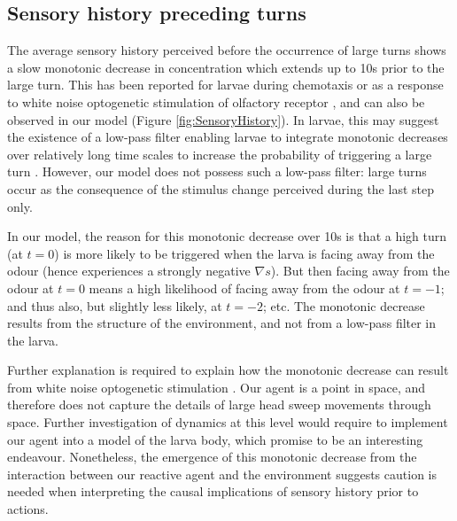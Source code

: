 \documentclass[11pt,a4paper]{article}
\newcommand{\todoML}[1]{\todo[author=ML,color=white, size=\tiny,inline]{#1}}
\begin{document}
\subsection{Sensory history preceding turns}
The average sensory history perceived before the occurrence of large turns shows a slow monotonic decrease in concentration which extends up to 10s prior to the large turn. This has been reported for larvae during chemotaxis \citep{gomez2011active} or as a response to white noise optogenetic stimulation of olfactory receptor \citep{gepner2015computations}, and can also be observed in our model (Figure \ref{fig:SensoryHistory}).
  In larvae, this may suggest the existence of a low-pass filter enabling larvae to integrate monotonic decreases over relatively long time scales to increase the probability of triggering a large turn \citep{gomez2011active,davies2015model,gepner2015computations}. However, our model does not possess such a low-pass filter: large turns occur as the consequence of the stimulus change perceived during the last step only.

 In our model, the reason for this monotonic decrease over 10s is that a high turn (at $t=0$) is more likely to be triggered when the larva is facing away from the odour (hence experiences a strongly negative $\nabla s$). But then facing away from the odour at $t=0$ means a high likelihood of facing away from the odour at $t=-1$; and thus also, but slightly less likely, at $t=-2$; etc. The monotonic decrease results from the structure of the environment, and not from a low-pass filter in the larva. 
 
  Further explanation is required to explain how the monotonic decrease can result from white noise optogenetic stimulation \cite{gepner2015computations}. Our agent is a point in space, and therefore does not capture the details of large head sweep movements through space. Further investigation of dynamics at this level would require to implement our agent into a model of the larva body, which promise to be an interesting endeavour. Nonetheless, the emergence of this monotonic decrease from the interaction between our reactive agent and the environment suggests caution is needed when interpreting the causal implications of sensory history prior to actions.
\end{document}
